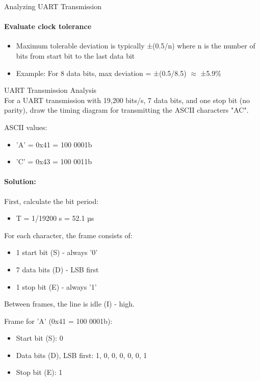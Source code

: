 \begin{KR}{Analyzing UART Transmission}
\paragraph{Evaluate clock tolerance}
\begin{itemize}
    \item Maximum tolerable deviation is typically ±(0.5/n) where n is the number of bits from start bit to the last data bit
    \item Example: For 8 data bits, max deviation = ±(0.5/8.5) $\approx$ ±5.9\%
\end{itemize}
\end{KR}

\begin{example2}{UART Transmission Analysis}\\
For a UART transmission with 19,200 bits/s, 7 data bits, and one stop bit (no parity), draw the timing diagram for transmitting the ASCII characters "AC".

ASCII values:
\begin{itemize}
    \item 'A' = 0x41 = 100 0001b
    \item 'C' = 0x43 = 100 0011b
\end{itemize}

\tcblower
\paragraph{Solution:}
First, calculate the bit period:
\begin{itemize}
    \item T = 1/19200 s = 52.1 µs
\end{itemize}

For each character, the frame consists of:
\begin{itemize}
    \item 1 start bit (S) - always '0'
    \item 7 data bits (D) - LSB first
    \item 1 stop bit (E) - always '1'
\end{itemize}

Between frames, the line is idle (I) - high.

Frame for 'A' (0x41 = 100 0001b):
\begin{itemize}
    \item Start bit (S): 0
    \item Data bits (D), LSB first: 1, 0, 0, 0, 0, 0, 1
    \item Stop bit (E): 1
\end{itemize}


\end{example2}
